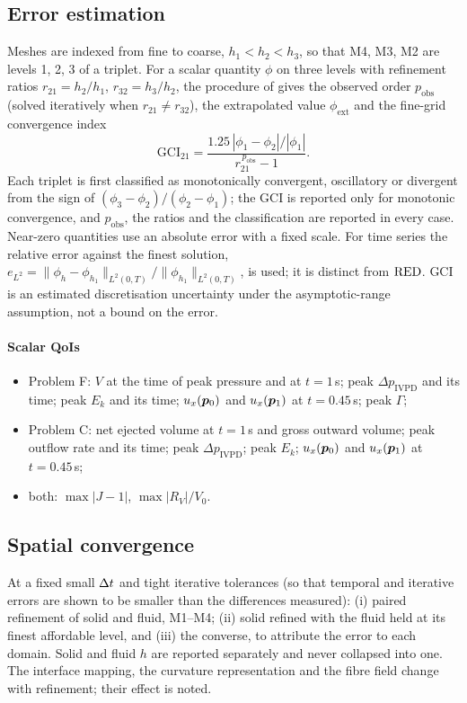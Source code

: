\subsection{Error estimation}\label{sec:ver:error}
Meshes are indexed from fine to coarse, $h_1<h_2<h_3$, so that M4, M3, M2
are levels 1, 2, 3 of a triplet. For a scalar quantity $\phi$ on three
levels with refinement ratios $r_{21}=h_2/h_1$, $r_{32}=h_3/h_2$, the
procedure of \citet{Celik2008} gives the observed order $p_{\mathrm{obs}}$
(solved iteratively when $r_{21}\ne r_{32}$), the extrapolated value
$\phi_{\mathrm{ext}}$ and the fine-grid convergence index
\begin{equation}
\mathrm{GCI}_{21} = \frac{1.25\,|\phi_1-\phi_2|/|\phi_1|}{r_{21}^{\,p_{\mathrm{obs}}}-1}.
\end{equation}
Each triplet is first classified as monotonically convergent, oscillatory or
divergent from the sign of $(\phi_3-\phi_2)/(\phi_2-\phi_1)$; the GCI is
reported only for monotonic convergence, and $p_{\mathrm{obs}}$, the ratios
and the classification are reported in every case. Near-zero quantities
use an absolute error with a fixed scale. For time series the relative
error against the finest solution,
$e_{L^2} = \|\phi_h-\phi_{h_1}\|_{L^2(0,T)}/\|\phi_{h_1}\|_{L^2(0,T)}$, is used;
it is distinct from $\mathrm{RED}$. GCI is an estimated discretisation uncertainty
under the asymptotic-range assumption, not a bound on the error.

\paragraph{Scalar QoIs}
\begin{itemize}
\item Problem F: $V$ at the time of peak pressure and at $t=1$\,s; peak
  $\Delta p_{\mathrm{IVPD}}$ and its time; peak $E_k$ and its time;
  $u_x(\bm{p}_0)$ and $u_x(\bm{p}_1)$ at $t=0.45$\,s; peak $\Gamma$;
\item Problem C: net ejected volume at $t=1$\,s and gross outward volume;
  peak outflow rate and its time; peak $\Delta p_{\mathrm{IVPD}}$; peak
  $E_k$; $u_x(\bm{p}_0)$ and $u_x(\bm{p}_1)$ at $t=0.45$\,s;
\item both: $\max|J-1|$, $\max|R_V|/V_0$.
\end{itemize}

\subsection{Spatial convergence}\label{sec:ver:mesh}
At a fixed small $\Delta t$ and tight iterative tolerances (so that temporal and
iterative errors are shown to be smaller than the differences measured):
(i) paired refinement of solid and fluid, M1--M4; (ii) solid refined with
the fluid held at its finest affordable level, and (iii) the converse, to
attribute the error to each domain. Solid and fluid $h$ are reported
separately and never collapsed into one. The interface mapping, the
curvature representation and the fibre field change with refinement; their
effect is noted.

